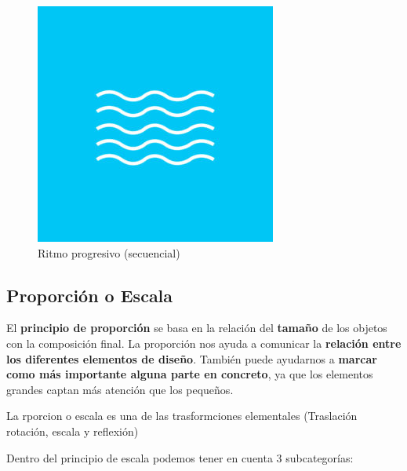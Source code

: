 \documentclass[
  16pt,
]{krantz}
\theoremstyle{definition}
\theoremstyle{definition}
\theoremstyle{definition}
\theoremstyle{definition}
\theoremstyle{remark}
\begin{document}
\begin{figure}

{\centering \includegraphics[width=1\linewidth,height=1\textheight]{ritmoo} 

}

\caption{Ritmo progresivo (secuencial)}\label{fig:rythmm}
\end{figure}

\hypertarget{proporciuxf3n-o-escala}{%
\subsection{Proporción o Escala}\label{proporciuxf3n-o-escala}}

El \textbf{principio de proporción} se basa en la relación del \textbf{tamaño} de los objetos con la composición final. La proporción nos ayuda a comunicar la \textbf{relación entre los diferentes elementos de diseño}. También puede ayudarnos a \textbf{marcar como más importante alguna parte en concreto}, ya que los elementos grandes captan más atención que los pequeños.

La rporcion o escala es una de las trasformciones elementales (Traslación rotación, escala y reflexión)

Dentro del principio de escala podemos tener en cuenta 3 subcategorías:
\end{document}
